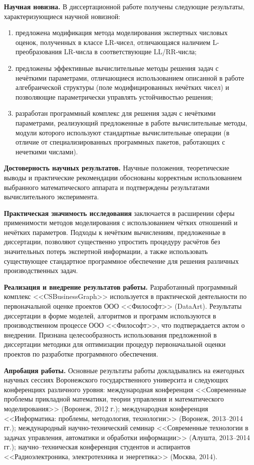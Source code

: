 \textbf{Научная новизна.} В диссертационной работе получены следующие результаты, характеризующиеся научной новизной:
\begin{enumerate}
  \item предложена модификация метода моделирования экспертных числовых оценок, полученных в классе LR-чисел, отличающаяся наличием L-преобразования LR-числа в соответствующие LL/RR-числа;
  \item предложены эффективные вычислительные методы решения задач с нечёткими параметрами, отличающиеся использованием описанной в работе алгебраической структуры (поле модифицированных нечётких чисел) и позволяющие параметрически управлять устойчивостью решения;
  \item разработан программный комплекс для решения задач с нечёткими параметрами, реализующий предложенные в работе вычислительные методы, модули которого используют стандартные вычислительные операции (в отличие от специализированных программных пакетов, работающих с нечеткими числами).
\end{enumerate}

\textbf{Достоверность научных результатов.} Научные положения, теоретические выводы и практические рекомендации обоснованы корректным использованием выбранного математического аппарата и подтверждены результатами вычислительного эксперимента.

\textbf{Практическая значимость исследования} заключается в расширении сферы применимости методов моделирования с использованием чётких отношений и нечётких параметров. Подходы к нечётким вычислениям, предложенные в диссертации, позволяют существенно упростить процедуру расчётов без значительных потерь экспертной информации, а также использовать существующее стандартное программное обеспечение для решения различных производственных задач.

\textbf{Реализация и внедрение результатов работы.} Разработанный программный комплекс <<CSBusinessGraph>> используется в практической деятельности по первоначальной оценке проектов ООО <<Философт>> (DataArt). Результаты диссертации в форме моделей, алгоритмов и программ используются в производственном процессе ООО <<Философт>>, что подтверждается актом о внедрении. Признана целесообразность использования предложенной в диссертации методики для оптимизации процедур первоначальной оценки проектов по разработке программного обеспечения.

\textbf{Апробация работы.} Основные результаты работы докладывались на ежегодных научных сессиях Воронежского государственного университа и следующих конференциях различного уровня: международная конференция <<Современные проблемы прикладной математики, теории управления и математического моделирования>> (Воронеж, 2012 г.); международная конференция <<Информатика: проблемы, методология, технологии>> (Воронеж, 2013--2014 гг.); международный научно-технический семинар <<Современные технологии в задачах управления, автоматики и обработки информации>> (Алушта, 2013--2014 гг.); научно--техническая конференция студентов и аспирантов <<Радиоэлектроника, электротехника и энергетика>> (Москва, 2014).

